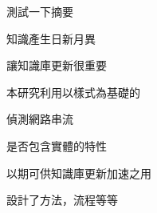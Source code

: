 \begin{abstractzh}
測試一下摘要

知識產生日新月異

讓知識庫更新很重要

本研究利用以樣式為基礎的

偵測網路串流

是否包含實體的特性

以期可供知識庫更新加速之用

設計了方法，流程等等

\end{abstractzh}

\begin{abstracten}
\end{abstracten}

%
%
